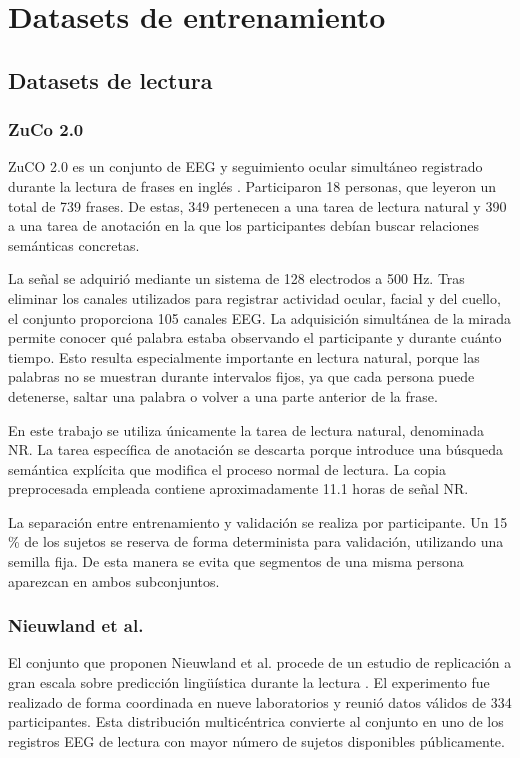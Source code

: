 \section{Datasets de entrenamiento}

\subsection{Datasets de lectura}

\subsubsection{ZuCo 2.0}

ZuCO 2.0 es un conjunto de EEG y seguimiento ocular simultáneo registrado durante la lectura de frases en inglés \cite{hollenstein2020zuco2}. Participaron 18 personas, que leyeron un total de 739 frases. De estas, 349 pertenecen a una tarea de lectura natural y 390 a una tarea de anotación en la que los participantes debían buscar relaciones semánticas concretas.

La señal se adquirió mediante un sistema de 128 electrodos a 500 Hz. Tras eliminar los canales utilizados para registrar actividad ocular, facial y del cuello, el conjunto proporciona 105 canales EEG. La adquisición simultánea de la mirada permite conocer qué palabra estaba observando el participante y durante cuánto tiempo. Esto resulta especialmente importante en lectura natural, porque las palabras no se muestran durante intervalos fijos, ya que cada persona puede detenerse, saltar una palabra o volver a una parte anterior de la frase.

En este trabajo se utiliza únicamente la tarea de lectura natural, denominada NR. La tarea específica de anotación se descarta porque introduce una búsqueda semántica explícita que modifica el proceso normal de lectura. La copia preprocesada empleada contiene aproximadamente 11.1 horas de señal NR.

La separación entre entrenamiento y validación se realiza por participante. Un 15\,\% de los sujetos se reserva de forma determinista para validación, utilizando una semilla fija. De esta manera se evita que segmentos de una misma persona aparezcan en ambos subconjuntos.

\subsubsection{Nieuwland et al.}

El conjunto que proponen Nieuwland et al. procede de un estudio de replicación a gran escala sobre predicción lingüística durante la lectura \cite{nieuwland2018large}. El experimento fue realizado de forma coordinada en nueve laboratorios y reunió datos válidos de 334 participantes. Esta distribución multicéntrica convierte al conjunto en uno de los registros EEG de lectura con mayor número de sujetos disponibles públicamente.

